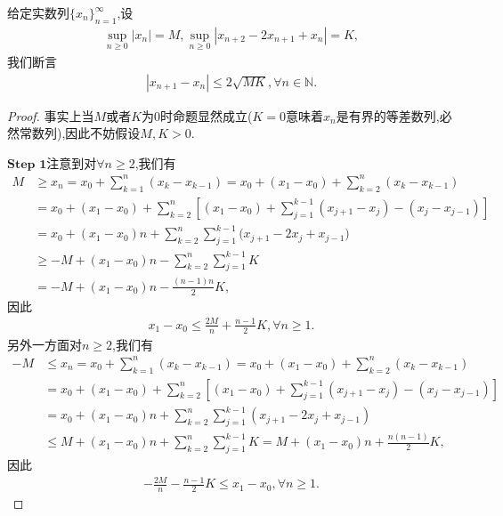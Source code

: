 \documentclass[../../main.tex]{subfiles}%
\begin{document}
\begin{proposition}[数列内插]\label{proposition:数列内插}
给定实数列$\{x_n\}_{n=1}^\infty$,设
\begin{align*}
\sup_{n \geqslant 0} |x_n| = M, \sup_{n \geqslant 0} |x_{n+2} - 2x_{n+1} + x_n| = K,
\end{align*}
我们断言
\begin{align*}
|x_{n+1} - x_n| \leqslant 2\sqrt{MK}, \forall n \in \mathbb{N}.
\end{align*}
\end{proposition}
\begin{proof}
事实上当$M$或者$K$为0时命题显然成立($K=0$意味着$x_n$是有界的等差数列,必然常数列),因此不妨假设$M,K>0$.

$\mathbf{Step}\,\,\mathbf{1}$注意到对$\forall n \geqslant 2$,我们有
\begin{align*}
M&\geqslant x_n=x_0+\sum_{k=1}^n{\left( x_k-x_{k-1} \right)}=x_0+\left( x_1-x_0 \right) +\sum_{k=2}^n{\left( x_k-x_{k-1} \right)}
\\
&=x_0+\left( x_1-x_0 \right) +\sum_{k=2}^n{\left[ \left( x_1-x_0 \right) +\sum_{j=1}^{k-1}{\left( x_{j+1}-x_j \right) -\left( x_j-x_{j-1} \right)} \right]}
\\
&=x_0+(x_1-x_0)n+\sum_{k=2}^n{\sum_{j=1}^{k-1}{(x_{j+1}}}-2x_j+x_{j-1})
\\
&\geqslant -M+(x_1-x_0)n-\sum_{k=2}^n{\sum_{j=1}^{k-1}{K}}
\\
&=-M+(x_1-x_0)n-\frac{(n-1)n}{2}K,
\end{align*}
因此
\begin{align*}
x_1 - x_0 \leqslant \frac{2M}{n} + \frac{n-1}{2}K, \forall n \geqslant 1.
\end{align*}
另外一方面对$n \geqslant 2$,我们有
\begin{align*}
-M&\leqslant x_n=x_0+\sum_{k=1}^n{\left( x_k-x_{k-1} \right)}=x_0+\left( x_1-x_0 \right) +\sum_{k=2}^n{\left( x_k-x_{k-1} \right)}
\\
&=x_0+\left( x_1-x_0 \right) +\sum_{k=2}^n{\left[ \left( x_1-x_0 \right) +\sum_{j=1}^{k-1}{\left( x_{j+1}-x_j \right) -\left( x_j-x_{j-1} \right)} \right]}
\\
&=x_0+(x_1-x_0)n+\sum_{k=2}^n{\sum_{j=1}^{k-1}{(x_{j+1}-2x_j+x_{j-1})}}
\\
&\leqslant M+(x_1-x_0)n+\sum_{k=2}^n{\sum_{j=1}^{k-1}{K=M}}+(x_1-x_0)n+\frac{n(n-1)}{2}K,
\end{align*}
因此
\begin{align*}
-\frac{2M}{n} - \frac{n-1}{2}K \leqslant x_1 - x_0, \forall n \geqslant 1.

\end{align*}
\end{proof}
\end{document}
